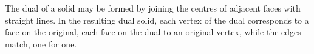 The dual of a solid may be formed by joining the centres of adjacent faces
with straight lines.  
In the resulting dual solid, each vertex of the dual corresponds to a face on the 
original, each face on the dual to an original vertex, while the edges match, one for one.
